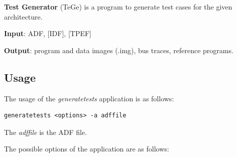 \documentclass[a4paper,twoside]{tceusermanual}
\begin{document}
\textbf{Test Generator} (TeGe) is a program to generate test cases for
the given architecture.

\textbf{Input}: ADF, [IDF], [TPEF]

\textbf{Output}: program and data images (.img), bus traces, reference
programs.

\subsection{Usage}

The usage of the \emph{generatetests} application is as follows:

\begin{verbatim}
generatetests <options> -a adffile
\end{verbatim}

The \emph{adffile} is the ADF file.

The possible options of the application are as follows:\\
\end{document}
